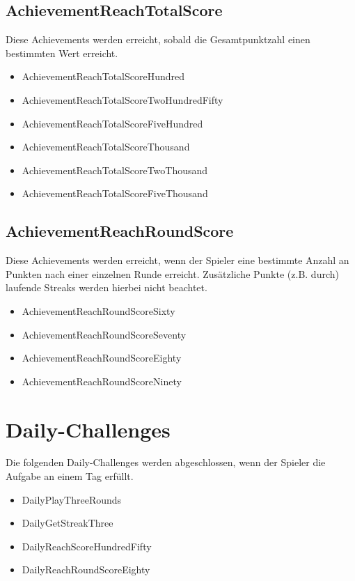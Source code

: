\documentclass[a4paper]{scrreprt}
\begin{document}
    \subsection{AchievementReachTotalScore}
    Diese Achievements werden erreicht, sobald die Gesamtpunktzahl einen bestimmten Wert erreicht. \\
    \begin{itemize}
        \item AchievementReachTotalScoreHundred
        \item AchievementReachTotalScoreTwoHundredFifty
        \item AchievementReachTotalScoreFiveHundred
        \item AchievementReachTotalScoreThousand
        \item AchievementReachTotalScoreTwoThousand
        \item AchievementReachTotalScoreFiveThousand
    \end{itemize}

    \subsection{AchievementReachRoundScore}
    Diese Achievements werden erreicht, wenn der Spieler eine bestimmte Anzahl an Punkten nach einer einzelnen Runde erreicht. Zusätzliche Punkte (z.B. durch) laufende Streaks werden hierbei nicht beachtet. \\
    \begin{itemize}
        \item AchievementReachRoundScoreSixty
        \item AchievementReachRoundScoreSeventy
        \item AchievementReachRoundScoreEighty
        \item AchievementReachRoundScoreNinety
    \end{itemize}


    \section{Daily-Challenges}
    \hypertarget{Daily}{}
    Die folgenden Daily-Challenges werden abgeschlossen, wenn der Spieler die Aufgabe an einem Tag erfüllt. \\
    \begin{itemize}
        \item DailyPlayThreeRounds
        \item DailyGetStreakThree
        \item DailyReachScoreHundredFifty
        \item DailyReachRoundScoreEighty
    \end{itemize}
\end{document}
